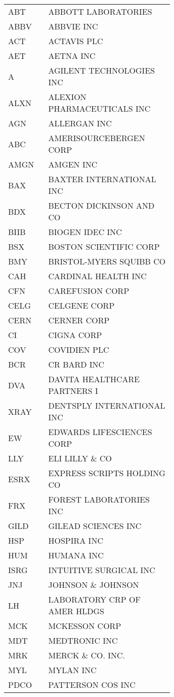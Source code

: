 \begin{longtable}{p{0.15\linewidth} p{0.5\linewidth}}
	ABT & ABBOTT LABORATORIES \\
	ABBV & ABBVIE INC \\
	ACT & ACTAVIS PLC \\
	AET & AETNA INC \\
	A & AGILENT TECHNOLOGIES INC \\
	ALXN & ALEXION PHARMACEUTICALS INC \\
	AGN & ALLERGAN INC \\
	ABC & AMERISOURCEBERGEN CORP \\
	AMGN & AMGEN INC \\
	BAX & BAXTER INTERNATIONAL INC \\
	BDX & BECTON DICKINSON AND CO \\
	BIIB & BIOGEN IDEC INC \\
	BSX & BOSTON SCIENTIFIC CORP \\
	BMY & BRISTOL-MYERS SQUIBB CO \\
	CAH & CARDINAL HEALTH INC \\
	CFN & CAREFUSION CORP \\
	CELG & CELGENE CORP \\
	CERN & CERNER CORP \\
	CI & CIGNA CORP \\
	COV & COVIDIEN PLC \\
	BCR & CR BARD INC \\
	DVA & DAVITA HEALTHCARE PARTNERS I \\
	XRAY & DENTSPLY INTERNATIONAL INC \\
	EW & EDWARDS LIFESCIENCES CORP \\
	LLY & ELI LILLY \& CO \\
	ESRX & EXPRESS SCRIPTS HOLDING CO \\
	FRX & FOREST LABORATORIES INC \\
	GILD & GILEAD SCIENCES INC \\
	HSP & HOSPIRA INC \\
	HUM & HUMANA INC \\
	ISRG & INTUITIVE SURGICAL INC \\
	JNJ & JOHNSON \& JOHNSON \\
	LH & LABORATORY CRP OF AMER HLDGS \\
	MCK & MCKESSON CORP \\
	MDT & MEDTRONIC INC \\
	MRK & MERCK \& CO. INC. \\
	MYL & MYLAN INC \\
	PDCO & PATTERSON COS INC \\

\end{longtable}
